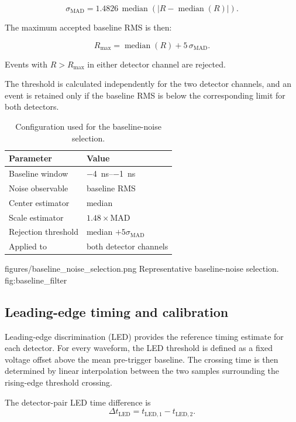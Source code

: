$$
\sigma_{\mathrm{MAD}}
=
1.4826\,
\operatorname{median}
\left(
\left|R-\operatorname{median}(R)\right|
\right).
$$

The maximum accepted baseline RMS is then:

$$
R_{\max}
=
\operatorname{median}(R)
+
5\,\sigma_{\mathrm{MAD}}.
$$

Events with \(R>R_{\max}\) in either detector channel are rejected.

The threshold is calculated independently for the two detector channels, and an event is retained only if the baseline RMS is 
below the corresponding limit for both detectors.

\begin{table}[t]
\centering
\caption{Configuration used for the baseline-noise selection.}
\label{tab:baseline-noise-config}
\small
\begin{tabular}{ll}
\toprule
Parameter & Value \\
\midrule
Baseline window & \SIrange{-4}{-1}{ns} \\
Noise observable & baseline RMS \\
Center estimator & median \\
Scale estimator & $1.48\times\mathrm{MAD}$ \\
Rejection threshold & median $+5\sigma_{\mathrm{MAD}}$ \\
Applied to & both detector channels \\
\bottomrule
\end{tabular}
\end{table}


\reportfigure
    {figures/baseline_noise_selection.png}
    {Representative baseline-noise selection.}
    {fig:baseline_filter}


\subsection{Leading-edge timing and calibration}

Leading-edge discrimination (LED) provides the reference timing estimate for each detector. 
For every waveform, the LED threshold is defined as a fixed voltage offset above the mean pre-trigger baseline. 
The crossing time is then determined by linear interpolation between the two samples surrounding the rising-edge threshold crossing.

The detector-pair LED time difference is
\begin{equation}
    \Delta t_{\mathrm{LED}} = t_{\mathrm{LED},1}-t_{\mathrm{LED},2}.
\end{equation}

